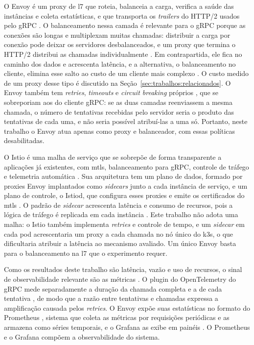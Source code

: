 O Envoy é um proxy de \gls{l7} que roteia, balanceia a carga, verifica a saúde das
instâncias e coleta estatísticas, e que transporta os \textit{trailers} do HTTP/2
usados pelo gRPC \cite{Envoy-Documentation:2026}. O balanceamento nessa camada é relevante para o
gRPC porque as conexões são longas e multiplexam muitas chamadas: distribuir a carga por conexão
pode deixar os servidores desbalanceados, e um proxy que termina o HTTP/2 distribui as
chamadas individualmente \cite{gRPC-LoadBalancing:2017}. Em contrapartida, ele fica no caminho dos
dados e acrescenta latência, e a alternativa, o balanceamento no cliente, elimina esse salto ao
custo de um cliente mais complexo \cite{gRPC-LoadBalancing:2017}. O custo medido de um
proxy desse tipo é discutido na Seção~\ref{sec:trabalhos:relacionados}. O Envoy também tem
\textit{retries}, \textit{timeouts} e \textit{circuit breaking} próprios
\cite{Envoy-Documentation:2026}, que se sobreporiam aos do cliente gRPC: se as duas camadas
reenviassem a mesma chamada, o número de tentativas recebidas pelo servidor seria o produto das
tentativas de cada uma, e não seria possível atribuí-las a uma só. Portanto, neste trabalho o Envoy
atua apenas como proxy e balanceador, com essas políticas desabilitadas.

O Istio é uma malha de serviço que se sobrepõe de forma transparente a
aplicações já existentes, com \gls{mtls}, balanceamento para gRPC, controle de tráfego e telemetria
automática \cite{Istio-Documentation:2026}. Sua arquitetura tem um plano de dados, formado por
proxies Envoy implantados como \textit{sidecars} junto a cada instância de serviço, e um
plano de controle, o Istiod, que configura esses proxies e emite os certificados do
\gls{mtls} \cite{Istio-Documentation:2026}. O padrão de \textit{sidecar} acrescenta latência e
consumo de recursos, pois a lógica de tráfego é replicada em cada instância
\cite{ServiceMesh-Evaluation:2022}. Este trabalho não adota uma malha: o Istio também implementa
\textit{retries} e controle de tempo, e um \textit{sidecar} em cada pod acrescentaria um
proxy a cada chamada no nó único do k3s, o que dificultaria atribuir a latência ao
mecanismo avaliado. Um único Envoy basta para o balanceamento na \gls{l7} que o experimento requer.

Como os resultados deste trabalho são latência, vazão e uso de recursos, o sinal de observabilidade
relevante são as métricas \cite{OpenTelemetry-Observability:2026}. O plugin do OpenTelemetry do gRPC
mede separadamente a duração da chamada completa e a de cada tentativa
\cite{gRPC-OpenTelemetry:2026}, de modo que a razão entre tentativas e chamadas expressa a
amplificação causada pelos \textit{retries}. O Envoy expõe suas estatísticas no formato do
Prometheus \cite{Envoy-Documentation:2026}, sistema que coleta as métricas por requisições
periódicas e as armazena como séries temporais, e o Grafana as exibe em painéis
\cite{Prometheus-Overview:2026, Grafana-Documentation:2026}. O Prometheus e o Grafana compõem a
observabilidade do sistema.

